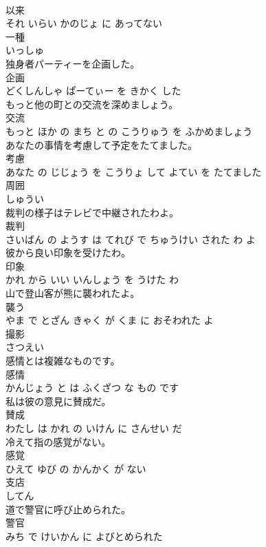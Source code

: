 \documentclass[8pt]{extreport}
\begin{document}
\begin{CJK}{UTF8}{min}
\\	以来 
\\	それ いらい かのじょ に あってない		
\\	一種	
\\	いっしゅ		
\\	独身者パーティーを企画した。	
\\	企画 
\\	どくしんしゃ ぱーてぃー を きかく した		
\\	もっと他の町との交流を深めましょう。	
\\	交流 
\\	もっと ほか の まち と の こうりゅう を ふかめましょう		
\\	あなたの事情を考慮して予定をたてました。	
\\	考慮 
\\	あなた の じじょう を こうりょ して よてい を たてました		
\\	周囲	
\\	しゅうい		
\\	裁判の様子はテレビで中継されたわよ。	
\\	裁判 
\\	さいばん の ようす は てれび で ちゅうけい された わ よ		
\\	彼から良い印象を受けたわ。	
\\	印象 
\\	かれ から いい いんしょう を うけた わ		
\\	山で登山客が熊に襲われたよ。	
\\	襲う 
\\	やま で とざん きゃく が くま に おそわれた よ		
\\	撮影	
\\	さつえい		
\\	感情とは複雑なものです。	
\\	感情 
\\	かんじょう と は ふくざつ な もの です		
\\	私は彼の意見に賛成だ。	
\\	賛成 
\\	わたし は かれ の いけん に さんせい だ		
\\	冷えて指の感覚がない。	
\\	感覚 
\\	ひえて ゆび の かんかく が ない		
\\	支店	
\\	してん		
\\	道で警官に呼び止められた。	
\\	警官 
\\	みち で けいかん に よびとめられた		

\end{CJK}
\end{document}
